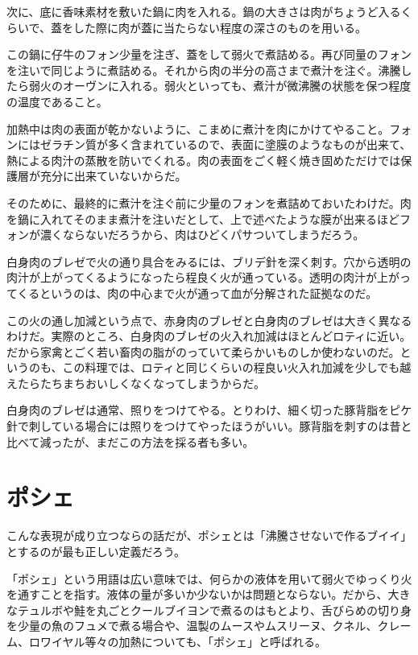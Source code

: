 次に、底に香味素材を敷いた鍋に肉を入れる。鍋の大きさは肉がちょうど入るくらいで、蓋をした際に肉が蓋に当たらない程度の深さのものを用いる。

この鍋に仔牛のフォン少量を注ぎ、蓋をして弱火で煮詰める。再び同量のフォンを注いで同じように煮詰める。それから肉の半分の高さまで煮汁を注ぐ。沸騰したら弱火のオーヴンに入れる。弱火といっても、煮汁が微沸騰の状態を保つ程度の温度であること。

加熱中は肉の表面が乾かないように、こまめに煮汁を肉にかけてやること。フォンにはゼラチン質が多く含まれているので、表面に塗膜のようなものが出来て、熱による肉汁の蒸散を防いでくれる。肉の表面をごく軽く焼き固めただけでは保護層が充分に出来ていないからだ。

そのために、最終的に煮汁を注ぐ前に少量のフォンを煮詰めておいたわけだ。肉を鍋に入れてそのまま煮汁を注いだとして、上で述べたような膜が出来るほどフォンが濃くならないだろうから、肉はひどくパサついてしまうだろう。

白身肉のブレゼで火の通り具合をみるには、ブリデ針を深く刺す。穴から透明の肉汁が上がってくるようになったら程良く火が通っている。透明の肉汁が上がってくるというのは、肉の中心まで火が通って血が分解された証拠なのだ。

この火の通し加減という点で、赤身肉のブレゼと白身肉のブレゼは大きく異なるわけだ。実際のところ、白身肉のブレゼの火入れ加減はほとんどロティに近い。だから家禽とごく若い畜肉の脂がのっていて柔らかいものしか使わないのだ。というのも、この料理では、ロティと同じくらいの程良い火入れ加減を少しでも越えたらたちまちおいしくなくなってしまうからだ。

白身肉のブレゼは通常、照りをつけてやる。とりわけ、細く切った豚背脂をピケ針で刺している場合には照りをつけてやったほうがいい。豚背脂を刺すのは昔と比べて減ったが、まだこの方法を採る者も多い。

\hypertarget{ux30ddux30b7ux30a7}{%
\section{ポシェ}\label{ux30ddux30b7ux30a7}}

こんな表現が成り立つならの話だが、ポシェとは「沸騰させないで作るブイイ」とするのが最も正しい定義だろう。

「ポシェ」という用語は広い意味では、何らかの液体を用いて弱火でゆっくり火を通すことを指す。液体の量が多いか少ないかは問題とならない。だから、大きなテュルボや鮭を丸ごとクールブイヨンで煮るのはもとより、舌びらめの切り身を少量の魚のフュメで煮る場合や、温製のムースやムスリーヌ、クネル、クレーム、ロワイヤル等々の加熱についても、「ポシェ」と呼ばれる。

